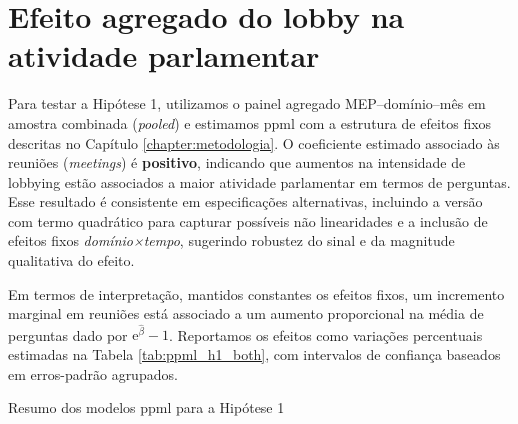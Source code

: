 \section{Efeito agregado do lobby na atividade parlamentar}
\label{sec:resultados_efeitos}

Para testar a Hipótese 1, utilizamos o painel agregado MEP–domínio–mês em amostra combinada (\textit{pooled}) e estimamos \acrshort{ppml} com a estrutura de efeitos fixos descritas no Capítulo \ref{chapter:metodologia}. O coeficiente estimado associado às reuniões (\textit{meetings}) é \textbf{positivo}, indicando que aumentos na intensidade de lobbying estão associados a maior atividade parlamentar em termos de perguntas. Esse resultado é consistente em especificações alternativas, incluindo a versão com termo quadrático para capturar possíveis não linearidades e a inclusão de efeitos fixos \textit{domínio×tempo}, sugerindo robustez do sinal e da magnitude qualitativa do efeito.

Em termos de interpretação, mantidos constantes os efeitos fixos, um incremento marginal em reuniões está associado a um aumento proporcional na média de perguntas dado por \(\mathrm{e}^{\hat{\beta}}-1\). Reportamos os efeitos como variações percentuais estimadas na Tabela \ref{tab:ppml_h1_both}, com intervalos de confiança baseados em erros-padrão agrupados.

\begin{table}[htbp]
\centering
\caption{Resumo dos modelos \acrshort{ppml} para a Hipótese 1}
\label{tab:ppml_h1_both}

\end{table}

